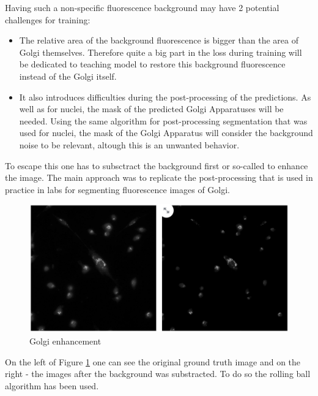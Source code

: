 Having such a non-specific fluorescence background may have 2 potential challenges for training:
\begin{itemize}
    \item The relative area of the background fluorescence is bigger than the area of Golgi themselves. Therefore quite a big part in the loss during training will be dedicated to teaching model to restore this background fluorescence instead of the Golgi itself.
    \item It also introduces difficulties during the post-processing of the predictions. As well as for nuclei, the mask of the predicted Golgi Apparatuses will be needed. Using the same algorithm for post-processing segmentation that was used for nuclei, the mask of the Golgi Apparatus will consider the background noise to be relevant, altough this is an unwanted behavior.
\end{itemize}

To escape this one has to subsctract the background first or so-called to enhance the image. The main approach was to replicate the post-processing that is used in practice in labs for segmenting fluorescence images of Golgi.

\begin{figure}[htb]
	\begin{center}
		\includegraphics[width=0.5\linewidth]{bilder/enhancement.jpg}
		\caption{Golgi enhancement}\label{fig:golgi-enhancement}
	\end{center}
\end{figure}

On the left of Figure \ref{fig:golgi-enhancement} one can see the original ground truth image and on the right - the images after the background was substracted. To do so the rolling ball algorithm has been used.